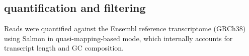 \subsection{ quantification and filtering}
\label{subsec:hird_dge_rnaseq_quantAndFilter}

Reads were quantified against the Ensembl reference transcriptome (GRCh38) using Salmon\autocite{patro2017SalmonProvidesFast} in quasi-mapping-based mode, which internally accounts for transcript length and GC composition.

